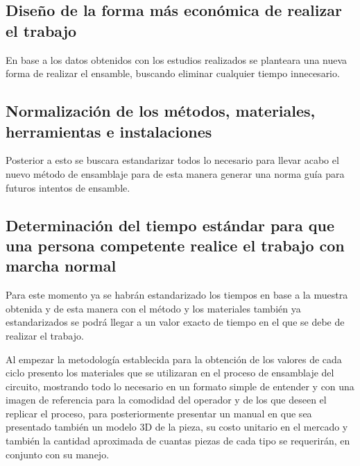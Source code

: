 \subsection{Diseño de la forma más económica de realizar el trabajo}
     En base a los datos obtenidos con los estudios realizados se planteara una nueva forma de realizar el ensamble, buscando eliminar cualquier tiempo innecesario.
        
\subsection{Normalización de los métodos, materiales, herramientas e instalaciones}
Posterior a esto se buscara estandarizar todos lo necesario para llevar acabo el nuevo método de ensamblaje para de esta manera generar una norma guía para futuros intentos de ensamble.
\subsection{Determinación del tiempo estándar para que una persona competente realice el trabajo con marcha normal}
Para este momento ya se habrán estandarizado los tiempos en base a la muestra obtenida y de esta manera con el método y los materiales también ya estandarizados se podrá llegar a un valor exacto de tiempo en el que se debe de realizar el trabajo.

        Al empezar la metodología establecida para la obtención de los valores de cada ciclo presento los materiales que se utilizaran en el proceso de ensamblaje del circuito, mostrando todo lo necesario en un formato simple de entender y con una imagen de referencia para la comodidad del operador y de los que deseen el replicar el proceso, para posteriormente presentar un manual en que sea presentado también un modelo 3D de la pieza, su costo unitario en el mercado y también la cantidad aproximada de cuantas piezas de cada tipo se requerirán, en conjunto con su manejo.
    
